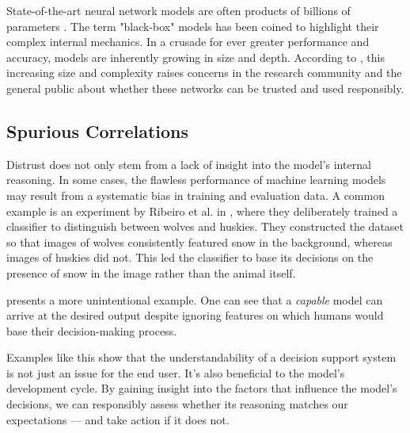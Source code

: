 State-of-the-art neural network models are often products of billions of parameters \cite{arrieta-taxonomy}.
The term "black-box" models has been coined to highlight their complex internal mechanics.
In a crusade for ever greater performance and accuracy, models are inherently growing in size and depth.
According to \cite{arrieta-taxonomy, xai-survey}, this increasing size and complexity raises concerns in the research community and the general public about whether these networks can be trusted and used responsibly.

\subsection*{Spurious Correlations}

Distrust does not only stem from a lack of insight into the model's internal reasoning.
In some cases, the flawless performance of machine learning models may result from a systematic bias in training and evaluation data.
A common example is an experiment by Ribeiro et al. in \cite{xai-husky}, where they deliberately trained a classifier to distinguish between wolves and huskies.
They constructed the dataset so that images of wolves consistently featured snow in the background, whereas images of huskies did not.
This led the classifier to base its decisions on the presence of snow in the image rather than the animal itself. 

 presents a more unintentional example.
One can see that a \emph{capable} model can arrive at the desired output despite ignoring features on which humans would base their decision-making process. 

Examples like this show that the understandability of a decision support system is not just an issue for the end user.
It's also beneficial to the model's development cycle.
By gaining insight into the factors that influence the model's decisions, we can responsibly assess whether its reasoning matches our expectations --- and take action if it does not.

